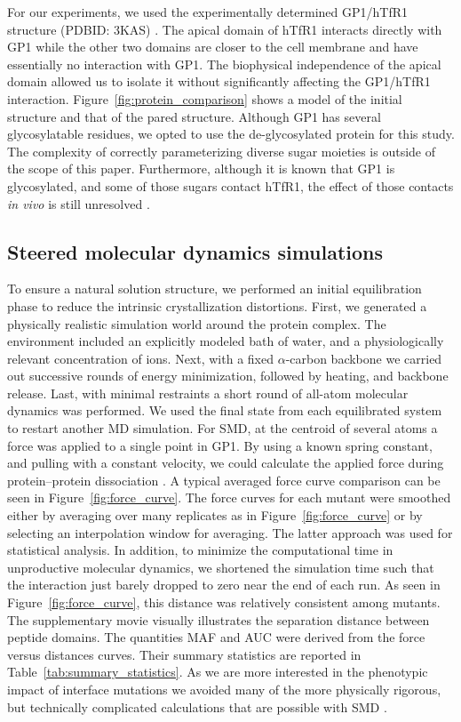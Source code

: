 \documentclass[12pt]{article}
\begin{document}
For our experiments, we used the experimentally determined GP1/hTfR1 structure (PDBID: 3KAS) \citep{Abraham2010}. The apical domain of hTfR1 interacts directly with GP1 while the other two domains are closer to the cell membrane and have essentially no interaction with GP1. The biophysical independence of the apical domain allowed us to isolate it without significantly affecting the GP1/hTfR1 interaction. Figure~\ref{fig:protein_comparison} shows a model of the initial structure and that of the pared structure. Although GP1 has several glycosylatable residues, we opted to use the de-glycosylated protein for this study. The complexity of correctly parameterizing diverse sugar moieties is outside of the scope of this paper. Furthermore, although it is known that GP1 is glycosylated, and some of those sugars contact hTfR1, the effect of those contacts \textit{in vivo} is still unresolved \citep{Abraham2010}.

\subsection*{Steered molecular dynamics simulations}
To ensure a natural solution structure, we performed an initial equilibration phase to reduce the intrinsic crystallization distortions. First, we generated a physically realistic simulation world around the protein complex. The environment included an explicitly modeled bath of water, and a physiologically relevant concentration of ions. Next, with a fixed $\alpha$-carbon backbone we carried out successive rounds of energy minimization, followed by heating, and backbone release. Last,  with minimal restraints a short round of all-atom molecular dynamics \citep{Cuendet2008} was performed. We used the final state from each equilibrated system to restart another MD simulation. For SMD, at the centroid of several atoms a force was applied to a single point in GP1. By using a known spring constant, and pulling with a constant velocity, we could calculate the applied force during protein--protein dissociation \citep{Cuendet2008,Cuendet2011}. A typical averaged force curve comparison can be seen in Figure~\ref{fig:force_curve}. The force curves for each mutant were smoothed either by averaging over many replicates as in Figure~\ref{fig:force_curve} or by selecting an interpolation window for averaging. The latter approach was used for statistical analysis. In addition, to minimize the computational time in unproductive molecular dynamics, we shortened the simulation time such that the interaction just barely dropped to zero near the end of each run. As seen in Figure~\ref{fig:force_curve}, this distance was relatively consistent among mutants. The supplementary movie visually illustrates the separation distance between peptide domains. The quantities MAF and AUC were derived from the force versus distances curves. Their summary statistics are reported in Table~\ref{tab:summary_statistics}. As we are more interested in the phenotypic impact of interface mutations we avoided many of the more physically rigorous, but technically complicated calculations that are possible with SMD \citep{Is2001A,Is2001B}.
\end{document}
